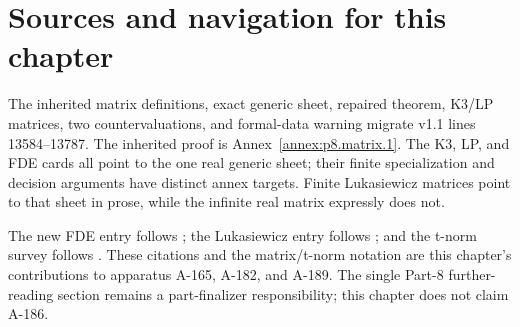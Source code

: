 \section{Sources and navigation for this chapter}

The inherited matrix definitions, exact generic sheet, repaired theorem,
K3/LP matrices, two countervaluations, and formal-data warning migrate v1.1
lines 13584--13787.  The inherited proof is
Annex~\ref{annex:p8.matrix.1}.  The K3, LP, and FDE cards all point to the one
real generic sheet; their finite specialization and decision arguments have
distinct annex targets.  Finite Lukasiewicz matrices point to that sheet in
prose, while the infinite real matrix expressly does not.

The new FDE entry follows \cite{Dunn1976,Belnap1977,OmoriWansing2017}; the
Lukasiewicz entry follows
\cite{LukasiewiczTarski1930,McNaughton1951,CignoliDOttavianoMundici2000}; and
the t-norm survey follows
\cite{Hajek1998,EstevaGodo2001,CintulaHajekNoguera2011}.  These citations and
the matrix/t-norm notation are this chapter's contributions to apparatus
A-165, A-182, and A-189.  The single Part-8 further-reading section remains a
part-finalizer responsibility; this chapter does not claim A-186.
